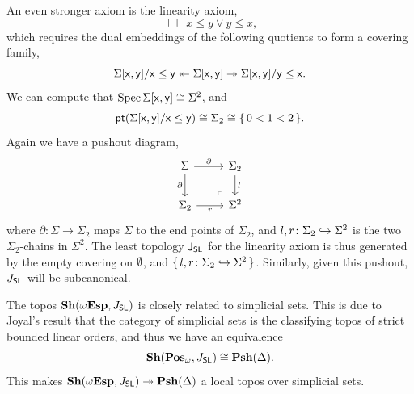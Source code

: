 \begin{example}[\AxiomSL]
  An even stronger axiom is the linearity axiom, 
  \[ \top \vdash x \le y \vee y \le x\text{,} \]
  which requires the dual embeddings of the following quotients to form a covering family,
  \[ \Sigma[\mathsf{x},\mathsf{y}]/\mathsf{x} \le \mathsf{y} \twoheadleftarrow \Sigma[\mathsf{x},\mathsf{y}] \twoheadrightarrow \Sigma[\mathsf{x},\mathsf{y}]/\mathsf{y} \le \mathsf{x}\text{.} \]
  We can compute that $\operatorname{Spec} \Sigma[\mathsf{x},\mathsf{y}] \cong \Sigma^2$, and 
  \[ \mathsf{pt}(\Sigma[\mathsf{x},\mathsf{y}]/\mathsf{x} \le \mathsf{y}) \cong \Sigma_2 \cong \{\,0 < 1 < 2\,\}\text{.} \]
  Again we have a pushout diagram,
  \[
  \begin{tikzcd}
    \Sigma \ar[r, "\partial"] \ar[d, "\partial"'] & \Sigma_2 \ar[d, "l"] \\ 
    \Sigma_2 \ar[r, "r"'] & \Sigma^2
    \arrow["\lrcorner"{anchor=center, pos=0.125, rotate=180}, draw=none, from=2-2, to=1-1]
  \end{tikzcd}
  \]
  where $\partial \colon \Sigma \to \Sigma_2$ maps $\Sigma$ to the end points of $\Sigma_2$, and $l,r \colon \Sigma_2 \hookrightarrow \Sigma^2$ is the two $\Sigma_2$-chains in $\Sigma^2$. The least topology $\mathsf{J}_{\mathsf{SL}}$ for the linearity axiom is thus generated by the empty covering on $\emptyset$, and $\{\,l,r \colon \Sigma_2 \hookrightarrow \Sigma^2\,\}$. Similarly, given this pushout, $J_{\mathsf{SL}}$ will be subcanonical.

  The topos $\mathbf{Sh}(\omega\mathbf{Esp},J_{\mathsf{SL}})$ is closely related to simplicial sets. This is due to Joyal's result that the category of simplicial sets is the classifying topos of strict bounded linear orders, and thus we have an equivalence 
  \[ \mathbf{Sh}(\mathbf{Pos}_\omega,J_{\mathsf{SL}}) \cong \mathbf{Psh}(\Delta)\text{.} \]
  This makes $\mathbf{Sh}(\omega\mathbf{Esp},J_{\mathsf{SL}}) \twoheadrightarrow \mathbf{Psh}(\Delta)$ a local topos over simplicial sets.
\end{example}

